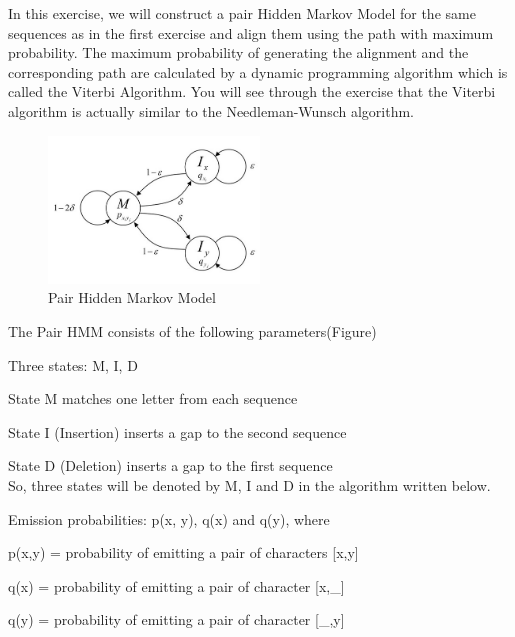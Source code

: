 \documentclass[a4paper,11pt]{article}
\begin{document}
In this exercise, we will construct a pair Hidden Markov Model for
the same sequences as in the first exercise and align them using the
path with maximum probability. The maximum probability of generating
the alignment and the corresponding path are calculated by a dynamic
programming algorithm which is called the Viterbi Algorithm. You will
see through the exercise that the Viterbi algorithm is actually similar
to the Needleman-Wunsch algorithm.

%
\begin{figure}[h]
\begin{center}
\includegraphics[width=0.5\textwidth]{HMM.jpg}\caption{Pair Hidden Markov Model}

\end{center}

%
\end{figure}


The Pair HMM consists of the following parameters(Figure)

\vspace{0.5cm}

Three states: M, I, D

State M matches one letter from each sequence

State I (Insertion) inserts a gap to the second sequence

State D (Deletion) inserts a gap to the first sequence\\


So, three states will be denoted by M, I and D in the algorithm written below.
\vspace{0.5cm}

Emission probabilities: p(x, y), q(x) and q(y), where

p(x,y) = probability of emitting a pair of characters {[}x,y{]}

q(x) = probability of emitting a pair of character {[}x,\_{]}

q(y) = probability of emitting a pair of character {[}\_,y{]}

\vspace{0.5cm}
\end{document}
